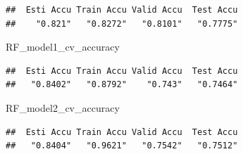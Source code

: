 \documentclass[
]{book}
\newenvironment{Shaded}{\begin{snugshade}}{\end{snugshade}}
\newcommand{\NormalTok}[1]{#1}
\begin{document}
\begin{verbatim}
##  Esti Accu Train Accu Valid Accu  Test Accu 
##    "0.821"   "0.8272"   "0.8101"   "0.7775"
\end{verbatim}

\begin{Shaded}
\begin{Highlighting}[]
\NormalTok{RF_model1_cv_accuracy}
\end{Highlighting}
\end{Shaded}

\begin{verbatim}
##  Esti Accu Train Accu Valid Accu  Test Accu 
##   "0.8402"   "0.8792"    "0.743"   "0.7464"
\end{verbatim}

\begin{Shaded}
\begin{Highlighting}[]
\NormalTok{RF_model2_cv_accuracy}
\end{Highlighting}
\end{Shaded}

\begin{verbatim}
##  Esti Accu Train Accu Valid Accu  Test Accu 
##   "0.8404"   "0.9621"   "0.7542"   "0.7512"
\end{verbatim}
\end{document}
